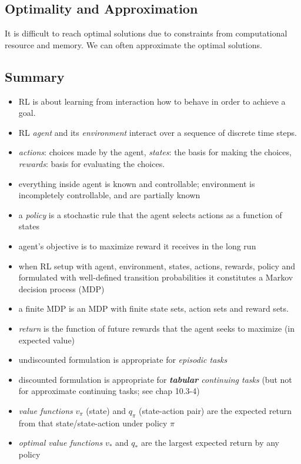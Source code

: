 \documentclass[lang=en,mode=geye,device=normal,color=blue,14pt]{elegantnote}
\DeclareMathOperator*{\1}{\mathbbm{1}}
\begin{document}
\subsection{Optimality and Approximation}

It is difficult to reach optimal solutions due to constraints from computational resource and memory. We can often approximate the optimal solutions.

\subsection{Summary}

\begin{itemize}
\item RL is about learning from interaction how to behave in order to achieve a goal.
\item RL \textit{agent} and its \textit{environment} interact over a sequence of discrete time steps.
\item \textit{actions}: choices made by the agent, \textit{states}: the basis for making the choices, \textit{rewards}: basis for evaluating the choices.
\item everything inside agent is known and controllable; environment is incompletely controllable, and are partially known
\item a \textit{policy} is a stochastic rule that the agent selects actions as a function of states
\item agent's objective is to maximize reward it receives in the long run
\item when RL setup with agent, environment, states, actions, rewards, policy and formulated with well-defined transition probabilities it constitutes a Markov decision process (MDP)
\item a finite MDP is an MDP with finite state sets, action sets and reward sets.
\item \textit{return} is the function of future rewards that the agent seeks to maximize (in expected value)
\item undiscounted formulation is appropriate for \textit{episodic tasks}
\item discounted formulation is appropriate for \textit{\textbf{tabular} continuing tasks} (but not for approximate continuing tasks; see chap 10.3-4)
\item \textit{value functions} $v_\pi$ (state) and $q_\pi$ (state-action pair) are the expected return from that state/state-action under policy $\pi$
\item \textit{optimal value functions} $v_*$ and $q_*$ are the largest expected return by any policy

\end{itemize}
\end{document}
